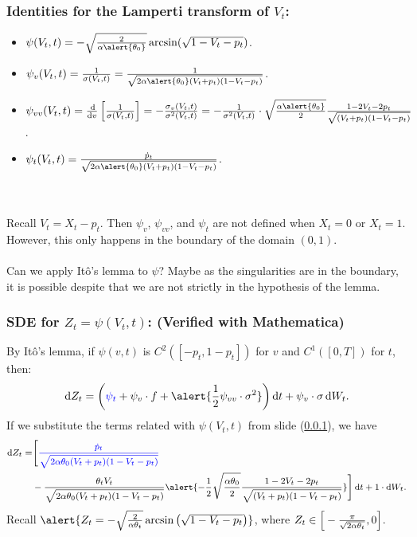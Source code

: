 \documentclass[aspectratio=169]{beamer}\usepackage[utf8]{inputenc}
\begin{document}
\begin{frame}\frametitle{Identities for the Lamperti transform of $V_t$:} \label{Q1}

\begin{itemize}
\item $\psi(V_t,t)=-\sqrt{\frac{2}{\alpha\alert{\theta_0}}}\arcsin(\sqrt{1-V_t-p_t})$.
\item $\psi_v(V_t,t)=\frac{1}{\sigma(V_t,t)}=\frac{1}{\sqrt{2\alpha\alert{\theta_0}(V_t+p_t)(1-V_t-p_t)}}$.
\item $\psi_{vv}(V_t,t)=\frac{\dif}{\dif v}\left[\frac{1}{\sigma(V_t,t)}\right]=-\frac{\sigma_v(V_t,t)}{\sigma^2(V_t,t)}=-\frac{1}{\sigma^2(V_t,t)}\cdot\sqrt{\frac{\alpha\alert{\theta_0}}{2}}\frac{1-2V_t-2p_t}{\sqrt{(V_t+p_t)(1-V_t-p_t)}}$.
\item $\psi_t(V_t,t)=\frac{\dot{p}_t}{\sqrt{2\alpha\alert{\theta_0}(V_t+p_t)(1-V_t-p_t)}}$.
\end{itemize}
\quad\\
\quad\\
Recall $V_t=X_t-p_t$. Then $\psi_v$, $\psi_{vv}$, and $\psi_t$ are not defined when $X_t=0$ or $X_t=1$. However, this only happens in the boundary of the domain $(0,1)$.\\
\quad\\
\alert{Can we apply It\^o's lemma to $\psi$? Maybe as the singularities are in the boundary, it is possible despite that we are not strictly in the hypothesis of the lemma.}
\end{frame}


\begin{frame}\frametitle{SDE for $Z_t=\psi(V_t,t)$: ({\color{green}Verified with Mathematica})}

By It\^o's lemma, if $\psi(v,t)$ is $C^2([-p_t,1-p_t])$ for $v$ and $C^1([0,T])$ for $t$, then:
\begin{equation*}
\dif Z_t=\left({\color{blue}\psi_t}+\psi_v\cdot f+\alert{\frac{1}{2}\psi_{vv}\cdot\sigma^2}\right)\dif t+\psi_v\cdot\sigma\dif W_t.
\end{equation*}
If we substitute the terms related with $\psi(V_t,t)$ from slide (\ref{Q1}), we have
\begin{equation*}
{\footnotesize
\begin{split}
\dif Z_t=&\Bigg[{\color{blue}\frac{\dot{p}_t}{\sqrt{2\alpha\theta_0(V_t+p_t)(1-V_t-p_t)}}}\\
&-\frac{\theta_tV_t}{\sqrt{2\alpha\theta_0(V_t+p_t)(1-V_t-p_t)}}\alert{-\frac{1}{2}\sqrt{\frac{\alpha\theta_0}{2}}\frac{1-2V_t-2p_t}{\sqrt{(V_t+p_t)(1-V_t-p_t)}}}\Bigg]\dif t+1\cdot \dif W_t.
\end{split}}
\end{equation*}
Recall $\alert{Z_t=-\sqrt{\frac{2}{\alpha\theta_t}}\arcsin\left(\sqrt{1-V_t-p_t}\right)}$, where $Z_t\in\Big[-\frac{\pi}{\sqrt{2\alpha\theta_t}},{\color{black}0\Big]}$.
\end{frame}
\end{document}
